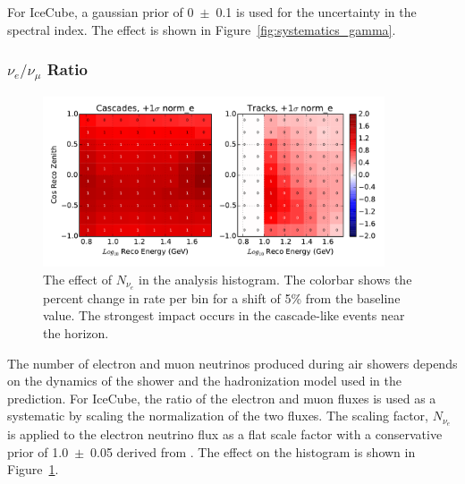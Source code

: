 For IceCube, a gaussian prior of 0~$\pm$~0.1 is used for the uncertainty in the spectral index.
The effect is shown in Figure~\ref{fig:systematics_gamma}.


\label{subsubsec:nue_ratio}
\subsubsection{$\nu_e/\nu_\mu$ Ratio}
\begin{figure}
\centering
\includegraphics[width=0.9\textwidth]{systematics/norm_e_variation.pdf} 
\caption[Effect of $N_{\nu_e}$ in the analysis histogram]{The effect of $N_{\nu_e}$ in the analysis histogram. The colorbar shows the percent change in rate per bin for a shift of 5\% from the baseline value. The strongest impact occurs in the cascade-like events near the horizon.}
\label{fig:systematics_norm_e}
\end{figure}

The number of electron and muon neutrinos produced during air showers depends on the dynamics of the shower and the hadronization model used in the prediction.
For IceCube, the ratio of the electron and muon fluxes is used as a systematic by scaling the normalization of the two fluxes.
The scaling factor, $N_{\nu_e}$ is applied to the electron neutrino flux as a flat scale factor with a conservative prior of 1.0~$\pm$~0.05 derived from \cite{NuFlux-Barr}.
The effect on the histogram is shown in Figure~\ref{fig:systematics_norm_e}.


\label{subsubsec:barr_ratios}
